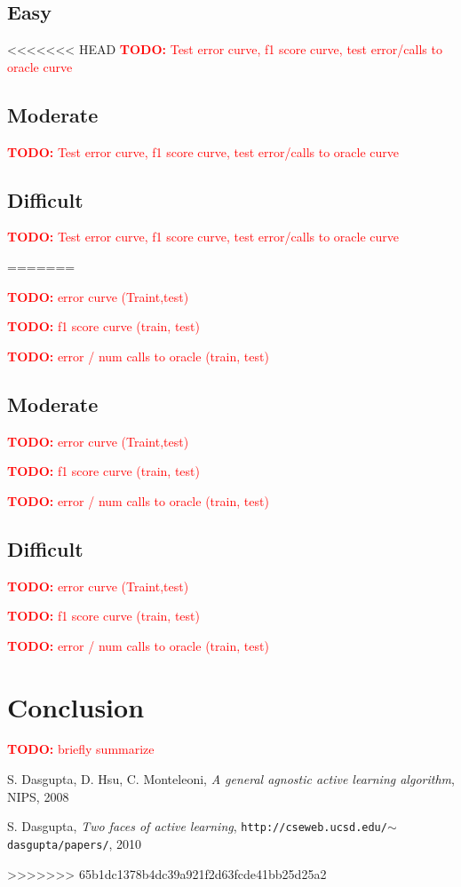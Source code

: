\documentclass[paper=a4, fontsize=11pt]{scrartcl}
\newcommand{\TODO}[1]{\textcolor{red}{\textbf{TODO: } #1}}
\numberwithin{equation}{section}		%
\numberwithin{figure}{section}			%
\numberwithin{table}{section}				%
\begin{document}
\subsection{Easy}
<<<<<<< HEAD
\TODO{Test error curve, f1 score curve, test error/calls to oracle curve}

\subsection{Moderate}
\TODO{Test error curve, f1 score curve, test error/calls to oracle curve}


\subsection{Difficult}
\TODO{Test error curve, f1 score curve, test error/calls to oracle curve}


=======


\TODO{error curve (Traint,test)}

\TODO{f1 score curve (train, test)}

\TODO{error / num calls to oracle (train, test) }

\subsection{Moderate}


\TODO{error curve (Traint,test)}

\TODO{f1 score curve (train, test)}

\TODO{error / num calls to oracle (train, test) }


\subsection{Difficult}


\TODO{error curve (Traint,test)}

\TODO{f1 score curve (train, test)}

\TODO{error / num calls to oracle (train, test) }


\section{Conclusion}

\TODO{briefly summarize}


\begin{thebibliography}{1}


S. Dasgupta, D. Hsu, C. Monteleoni, \emph{A general agnostic active learning algorithm}, NIPS, 2008 

S. Dasgupta, \emph{Two faces of active learning}, \texttt{http://cseweb.ucsd.edu/$\sim$dasgupta/papers/}, 2010

\end{thebibliography}
>>>>>>> 65b1dc1378b4dc39a921f2d63fcde41bb25d25a2
\end{document}

